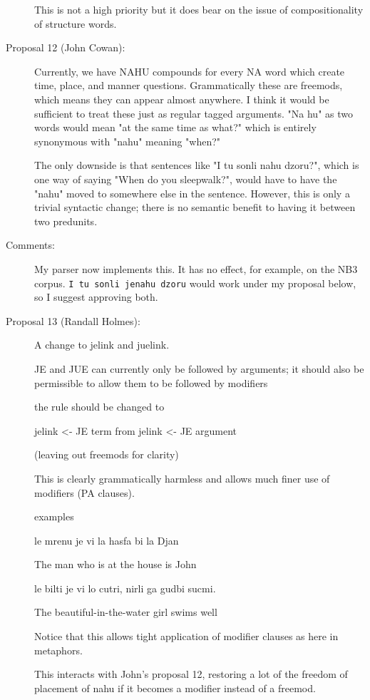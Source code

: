 \documentclass[12pt]{article}
\begin{document}
\begin{description}
This is not a high priority but it does bear on the issue of compositionality of structure words.



\item[Proposal 12 (John Cowan):]

Currently, we have NAHU compounds for every NA word which create time,
place, and manner questions.  Grammatically these are freemods, which
means they can appear almost anywhere.  I think it would be sufficient
to treat these just as regular tagged arguments.  "Na hu" as two words
would mean "at the same time as what?" which is entirely synonymous with
"nahu" meaning "when?"

The only downside is that sentences like "I tu sonli nahu dzoru?", which
is one way of saying "When do you sleepwalk?", would have to have the
"nahu" moved to somewhere else in the sentence.  However, this is only
a trivial syntactic change; there is no semantic benefit to having it
between two predunits.

\item[Comments:]  My parser now implements this.  It has no effect, for example, on the NB3 corpus.
{\tt I tu sonli jenahu dzoru} would work under my proposal below, so I suggest approving both.


\item[Proposal 13 (Randall Holmes):]  A change to jelink and juelink.

JE and JUE can currently only be followed by arguments;
it should also be permissible to allow them to be followed
by modifiers

the rule should be changed to 

jelink <- JE term from jelink <- JE argument

(leaving out freemods for clarity)

This is clearly grammatically harmless and allows much
finer use of modifiers (PA clauses).

examples

le mrenu je vi la hasfa bi la Djan

The man who is at the house is John

le bilti je vi lo cutri, nirli ga gudbi sucmi.

The beautiful-in-the-water girl swims well

Notice that this allows tight application of modifier clauses
as here in metaphors.

This interacts with John's proposal 12, restoring 
a lot of the freedom of placement of nahu if it 
becomes a modifier instead of a freemod.


\end{description}
\end{document}
